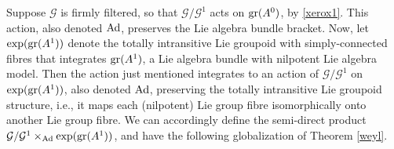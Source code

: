 \documentclass[leqno,12pt]{amsart} %
\begin{document}
Suppose ${\mathcal G} $ is firmly filtered, so that ${\mathcal G}/{\mathcal G}^1 $ acts on
$\operatorname{\operatorname{gr}}(A^0)$, by \eqref{xerox1}. This action, also denoted $\operatorname{Ad}$, preserves the Lie
algebra bundle bracket. Now, let $\exp(\operatorname{\operatorname{gr}}(A^1))$ denote the totally intransitive Lie
groupoid with simply-connected fibres that integrates $\operatorname{\operatorname{gr}}(A^1)$, a Lie algebra bundle
with nilpotent Lie algebra model. Then the action just mentioned integrates to an action
of ${\mathcal G}/{\mathcal G}^1$ on $\exp(\operatorname{\operatorname{gr}}(A^1))$, also denoted $\operatorname{Ad}$,
preserving the totally intransitive Lie groupoid structure, i.e., it maps each (nilpotent)
Lie group fibre isomorphically onto another Lie group fibre. We can accordingly define
the semi-direct product ${\mathcal G}/{\mathcal G}^1 \times_{\operatorname{Ad}}\exp(\operatorname{\operatorname{gr}}(A^1))$,
and have the following globalization of Theorem \ref{weyl}.
\end{document}
